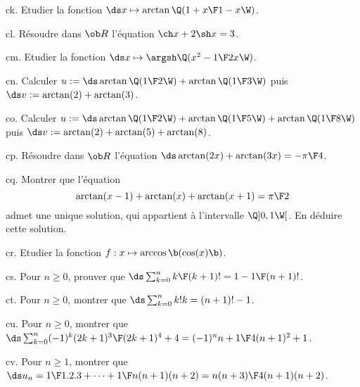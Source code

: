 \exo [Level=1,Fight=2,Learn=1,Field=\Fonctions,Type=\Exercices,Origin=] ck. 
Etudier la fonction $\ds x\mapsto\arctan\Q({1+x\F1-x}\W)$. 

\exo [Level=1,Fight=1,Learn=1,Field=\TrigonométrieHyperbolique,Type=\Exercices,Origin=] cl. Résoudre dans $\ob R$ l'équation $\ch x+2\sh x=3$. 

\exo [Level=1,Fight=2,Learn=1,Field=\Fonctions,Type=\Exercices,Origin=] cm. 
Etudier la fonction $\ds x\mapsto\argsh\Q({x^2-1\F2x}\W)$. 

\exo [Level=1,Fight=2,Learn=1,Field=\Fonctions,Type=\Exercices,Origin=] cn. 
Calculer $u:=\ds\arctan\Q({1\F2}\W)+\arctan\Q({1\F3}\W)$ puis $\ds v:=\arctan(2)+\arctan(3)$. 

\exo [Level=1,Fight=2,Learn=1,Field=\Fonctions,Type=\Exercices,Origin=] co. 
Calculer $u:=\ds\arctan\Q({1\F2}\W)+\arctan\Q({1\F5}\W)+\arctan\Q({1\F8}\W)$ puis $\ds v:=\arctan(2)+\arctan(5)+\arctan(8)$. 

\exo [Level=1,Fight=1,Learn=0,Field=\Fonctions,Type=\Exercices,Origin=] cp. 
Résoudre dans $\ob R$ l'équation $\ds\arctan(2x)+\arctan(3x)=-{\pi\F4}$.

\exo [Level=1,Fight=1,Learn=0,Field=\Fonctions,Type=\Exercices,Origin=] cq. 
Montrer que l'équation 
$$
\arctan(x-1)+\arctan(x)+\arctan(x+1)={\pi\F2}
$$
admet une unique solution, qui appartient à l'intervalle $\Q]0,1\W[$. En déduire cette solution. 

\exo [Level=1,Fight=2,Learn=1,Field=\Fonctions,Type=\TravauxDirigés,Origin=]cr. 
Etudier la fonction $f:x\mapsto\arccos\b(\cos(x)\b)$. 

\exo [Level=1,Fight=1,Learn=0,Field=\Récurrences,Type=\Exercices,Origin=\Capaces] cs. 
Pour $n\ge0$, prouver que $\ds\sum_{k=0}^n{k\F(k+1)!}=1-{1\F(n+1)!}$. 

\exo [Level=1,Fight=1,Learn=0,Field=\Récurrences,Type=\Exercices,Origin=\Capaces] ct. 
Pour $n\ge0$, montrer que $\ds\sum_{k=0}^nk!k=(n+1)!-1$. 
 
\exo [Level=1,Fight=1,Learn=0,Field=\Récurrences,Type=\Exercices,Origin=\Capaces] cu. 
Pour $n\ge0$, montrer que $\ds\sum_{k=0}^n(-1)^k{(2k+1)^3\F(2k+1)^4+4}=(-1)^n{n+1\F 4(n+1)^2+1}$. 

\exo [Level=1,Fight=1,Learn=0,Field=\Récurrences,Type=\Exercices,Origin=\Capaces] cv. 
Pour $n\ge1$, montrer que $\ds u_n={1\F1.2.3}+\cdots+{1\F n(n+1)(n+2)}={n(n+3)\F4(n+1)(n+2)}$. 

